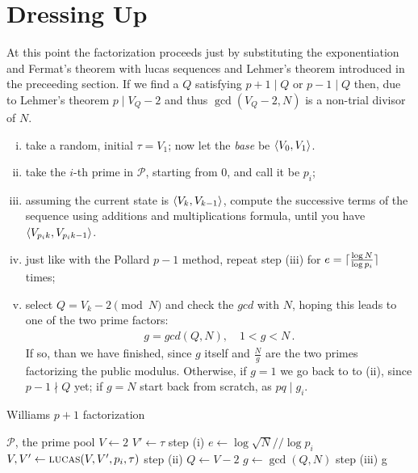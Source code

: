 \section{Dressing Up}

At this point the factorization proceeds just by substituting the
exponentiation and Fermat's theorem with lucas sequences and Lehmer's theorem
introduced in the preceeding section. If we find a $Q$ satisfying $p+1 \mid Q
\text{ or } p-1 \mid Q$ then, due to Lehmer's theorem $p \mid V_Q -2$ and thus
$\gcd(V_Q -2, N)$ is a non-trial divisor of $N$.

\begin{enumerate}[(i)]
\item take a random, initial $\tau = V_1$; now let the \emph{base} be
  $\langle V_0, V_1\rangle$.
\item take the $i$-th prime in $\mathcal{P}$, starting from $0$, and call it be
  $p_i$;
\item assuming the current state is $\langle V_k, V_{k-1}\rangle$, compute the
  successive terms of the sequence using additions and multiplications formula,
  until you have $\langle V_{p_ik}, V_{p_ik - 1}\rangle$.
\item just like with the Pollard $p-1$ method, repeat step (iii) for $e =
  \lceil\frac{\log N}{\log p_i}\rceil$ times;
\item select $Q = V_k - 2 \pmod{N}$ and check the $gcd$ with $N$, hoping this
  leads to one of the two prime factors:
\begin{align}
  g = gcd(Q, N), \quad 1 < g < N \,.
\end{align}
If so, than we have finished, since $g$ itself and $\frac{N}{g}$
are the two primes factorizing the public  modulus.
Otherwise, if $g = 1$ we go back to to (ii), since $p-1 \nmid Q$ yet;
if $g = N$ start back from scratch, as $pq \mid g_i$.

\end{enumerate}



\begin{algorithm}
  \caption{Williams $p+1$ factorization}
  \begin{algorithmic}[1]
    \Require $\mathcal{P}$, the prime pool
      \State $V \gets 2$
      \State $V' \gets \tau$
      \Comment step (i)
        \State $e \gets \log \sqrt{N} // \log p_i$
          \State $V, V' \gets \textsc{lucas}(V, V', p_i, \tau)$
          \Comment step (ii)
          \State $Q \gets V -2$
          \State $g \gets \gcd(Q, N)$
          \Comment step (iii)
           \Return {}
           \Return g
          \EndIf
        \EndFor
      \EndFor
    \EndFunction
  \end{algorithmic}
\end{algorithm}
